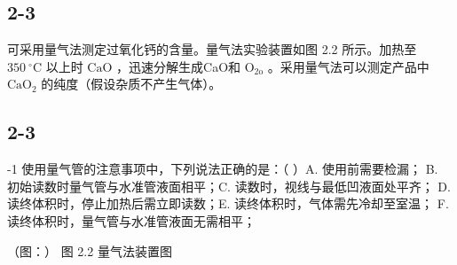 \subsection*{2-3}
可采⽤量⽓法测定过氧化钙的含量。量⽓法实验装置如图 2.2 所⽰。加热⾄ $3 5 0 ~ ^ { \circ } \mathrm { C }$ 以上时 $\mathrm { C a O }$ ，迅速分解⽣成CaO和 $\mathrm { O } _ { 2 \mathrm { o } }$ 。采⽤量⽓法可以测定产品中 $\mathrm { C a O _ { 2 } }$ 的纯度（假设杂质不产⽣⽓体）。

\subsection*{2-3}
-1 使⽤量⽓管的注意事项中，下列说法正确的是：（ ）A. 使⽤前需要检漏； B. 初始读数时量⽓管与⽔准管液⾯相平；C. 读数时，视线与最低凹液⾯处平⻬； D. 读终体积时，停⽌加热后需⽴即读数；E. 读终体积时，⽓体需先冷却⾄室温； F. 读终体积时，量⽓管与⽔准管液⾯⽆需相平；

（图：）
图 2.2 量⽓法装置图

